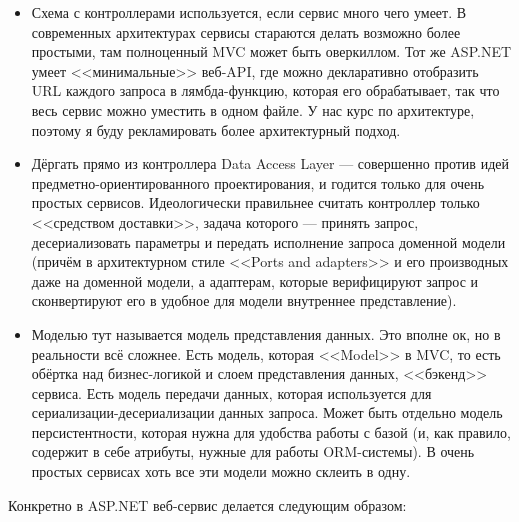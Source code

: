 \documentclass[a5paper]{article}
\begin{document}
\begin{itemize}
    \item Схема с контроллерами используется, если сервис много чего умеет. В современных архитектурах сервисы стараются делать возможно более простыми, там полноценный MVC может быть оверкиллом. Тот же ASP.NET умеет <<минимальные>> веб-API, где можно декларативно отобразить URL каждого запроса в лямбда-функцию, которая его обрабатывает, так что весь сервис можно уместить в одном файле. У нас курс по архитектуре, поэтому я буду рекламировать более архитектурный подход.
    \item Дёргать прямо из контроллера Data Access Layer --- совершенно против идей предметно-ориентированного проектирования, и годится только для очень простых сервисов. Идеологически правильнее считать контроллер только <<средством доставки>>, задача которого --- принять запрос, десериализовать параметры и передать исполнение запроса доменной модели (причём в архитектурном стиле <<Ports and adapters>> и его производных даже на доменной модели, а адаптерам, которые верифицируют запрос и сконвертируют его в удобное для модели внутреннее представление).
    \item Моделью тут называется модель представления данных. Это вполне ок, но в реальности всё сложнее. Есть модель, которая <<Model>> в MVC, то есть обёртка над бизнес-логикой и слоем представления данных, <<бэкенд>> сервиса. Есть модель передачи данных, которая используется для сериализации-десериализации данных запроса. Может быть отдельно модель персистентности, которая нужна для удобства работы с базой (и, как правило, содержит в себе атрибуты, нужные для работы ORM-системы). В очень простых сервисах хоть все эти модели можно склеить в одну.
\end{itemize}

Конкретно в ASP.NET веб-сервис делается следующим образом:
\end{document}

